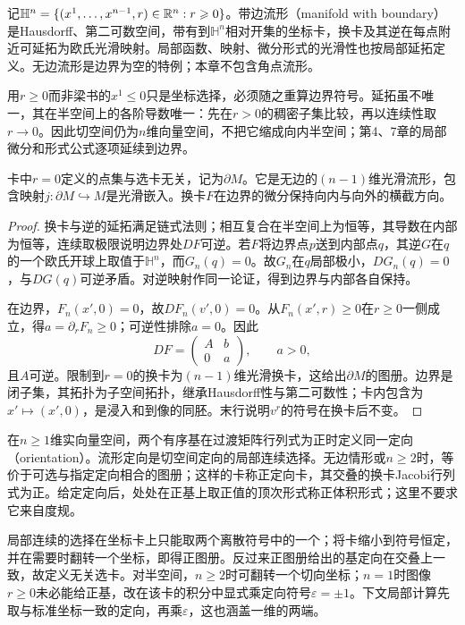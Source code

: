 \begin{definition}[半空间与带边光滑结构]
记$\mathbb H^n=\{(x^1,\ldots,x^{n-1},r)\in\mathbb{R}^n:r\geqslant0\}$。带边流形（manifold with boundary）是Hausdorff、第二可数空间，带有到$\mathbb H^n$相对开集的坐标卡，换卡及其逆在每点附近可延拓为欧氏光滑映射。局部函数、映射、微分形式的光滑性也按局部延拓定义。无边流形是边界为空的特例；本章不包含角点流形。
\end{definition}
用$r\geq0$而非梁书的$x^1\leq0$只是坐标选择，必须随之重算边界符号。延拓虽不唯一，其在半空间上的各阶导数唯一：先在$r>0$的稠密子集比较，再以连续性取$r\to0$。因此切空间仍为$n$维向量空间，不把它缩成向内半空间；第4、7章的局部微分和形式公式逐项延续到边界。

\begin{proposition}[边界及其光滑结构]\label{prop:boundary-atlas}
卡中$r=0$定义的点集与选卡无关，记为$\partial M$。它是无边的$(n-1)$维光滑流形，包含映射$j:\partial M\hookrightarrow M$是光滑嵌入。换卡$F$在边界的微分保持向内与向外的横截方向。
\end{proposition}
\begin{proof}
换卡与逆的延拓满足链式法则；相互复合在半空间上为恒等，其导数在内部为恒等，连续取极限说明边界处$DF$可逆。若$F$将边界点$p$送到内部点$q$，其逆$G$在$q$的一个欧氏开球上取值于$\mathbb H^n$，而$G_n(q)=0$。故$G_n$在$q$局部极小，$DG_n(q)=0$，与$DG(q)$可逆矛盾。对逆映射作同一论证，得到边界与内部各自保持。

在边界，$F_n(x',0)=0$，故$DF_n(v',0)=0$。从$F_n(x',r)\geq0$在$r\geq0$一侧成立，得$a=\partial_rF_n\geq0$；可逆性排除$a=0$。因此
\[
 DF=\begin{pmatrix}A&b\\0&a\end{pmatrix},\qquad a>0,
\]
且$A$可逆。限制到$r=0$的换卡为$(n-1)$维光滑换卡，这给出$\partial M$的图册。边界是闭子集，其拓扑为子空间拓扑，继承Hausdorff性与第二可数性；卡内包含为$x'\mapsto(x',0)$，是浸入和到像的同胚。末行说明$v^r$的符号在换卡后不变。
\end{proof}

\begin{definition}[定向与正定向卡]
在$n\geq1$维实向量空间，两个有序基在过渡矩阵行列式为正时定义同一定向（orientation）。流形定向是切空间定向的局部连续选择。无边情形或$n\geq2$时，等价于可选与指定定向相合的图册；这样的卡称正定向卡，其交叠的换卡Jacobi行列式为正。给定定向后，处处在正基上取正值的顶次形式称正体积形式；这里不要求它来自度规。
\end{definition}
局部连续的选择在坐标卡上只能取两个离散符号中的一个；将卡缩小到符号恒定，并在需要时翻转一个坐标，即得正图册。反过来正图册给出的基定向在交叠上一致，故定义无关选卡。对半空间，$n\geq2$时可翻转一个切向坐标；$n=1$时图像$r\geq0$未必能给正基，改在该卡的积分中显式乘定向符号$\varepsilon=\pm1$。下文局部计算先取与标准坐标一致的定向，再乘$\varepsilon$，这也涵盖一维的两端。

